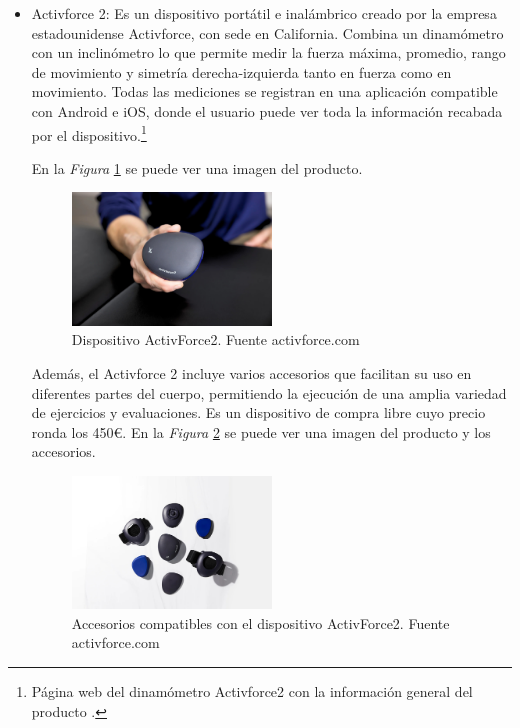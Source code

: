 \begin{itemize}
    \item Activforce 2: Es un dispositivo portátil e inalámbrico creado por la empresa estadounidense Activforce, con sede en California. Combina un dinamómetro con un inclinómetro lo que permite medir la fuerza máxima, promedio, rango de movimiento y simetría derecha-izquierda tanto en fuerza como en movimiento. Todas las mediciones se registran en una aplicación compatible con Android e iOS, donde el usuario puede ver toda la información recabada por el dispositivo.\cite{activforce}\footnote{Página web del dinamómetro Activforce2 con la información general del producto \cite{activforce}.}
    
    En la \textit{Figura} \ref{fig:activforce} se puede ver una imagen del producto.
    \begin{figure}[h]
        \centering
        \includegraphics[width=0.5\textwidth]{img/ActivForce_Device.jpg}
        \caption{Dispositivo ActivForce2. Fuente activforce.com}
        \label{fig:activforce}
    \end{figure}
    
    Además, el Activforce 2 incluye varios accesorios que facilitan su uso en diferentes partes del cuerpo, permitiendo la ejecución de una amplia variedad de ejercicios y evaluaciones. Es un dispositivo de compra libre cuyo precio ronda los 450€. En la \textit{Figura} \ref{fig:activforce_Attachments} se puede ver una imagen del producto y los accesorios.
    \begin{figure}[h]
        \centering
        \includegraphics[width=0.5\textwidth]{img/ActivForce_Attachments.jpg}
        \caption{Accesorios compatibles con el dispositivo ActivForce2. Fuente activforce.com}
        \label{fig:activforce_Attachments}
    \end{figure}


\end{itemize}
